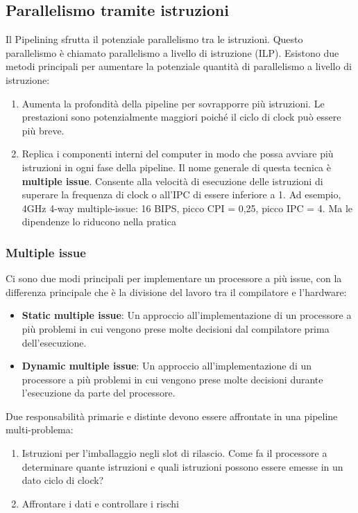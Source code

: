 \documentclass[12pt,a4paper]{article}
\begin{document}
\subsection{Parallelismo tramite istruzioni} 
Il Pipelining sfrutta il potenziale parallelismo tra le istruzioni. Questo parallelismo è chiamato parallelismo a livello di istruzione (ILP). Esistono due metodi principali per aumentare la potenziale quantità di parallelismo a livello di istruzione:
\begin{enumerate}
\item Aumenta la profondità della pipeline per sovrapporre più istruzioni. Le prestazioni sono potenzialmente maggiori poiché il ciclo di clock può essere più breve.
\item Replica i componenti interni del computer in modo che possa avviare più istruzioni in ogni fase della pipeline. Il nome generale di questa tecnica è \textbf{multiple issue}. Consente alla velocità di esecuzione delle istruzioni di superare la frequenza di clock o all'IPC di essere inferiore a 1. Ad esempio, 4GHz 4-way multiple-issue: 16 BIPS, picco CPI = 0,25, picco IPC = 4. Ma le dipendenze lo riducono nella pratica
\end{enumerate}
\subsubsection{Multiple issue}
Ci sono due modi principali per implementare un processore a più issue, con la differenza principale che è la divisione del lavoro tra il compilatore e l'hardware:
\begin{itemize}
\item \textbf{Static multiple issue}: Un approccio all'implementazione di un processore a più problemi in cui vengono prese molte decisioni dal compilatore prima dell'esecuzione.
\item \textbf{Dynamic multiple issue}:  Un approccio all'implementazione di un processore a più problemi in cui vengono prese molte decisioni durante l'esecuzione da parte del processore.
\end{itemize}
Due responsabilità primarie e distinte devono essere affrontate in una pipeline multi-problema:
\begin{enumerate}
\item Istruzioni per l'imballaggio negli slot di rilascio. Come fa il processore a determinare quante istruzioni e quali istruzioni possono essere emesse in un dato ciclo di clock?
\item Affrontare i dati e controllare i rischi
\end{enumerate}
\end{document}
